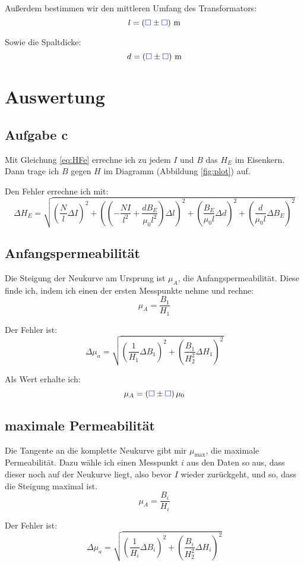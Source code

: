 \documentclass[11pt, ngerman]{article}
\newcommand{\emesswert}{\left(\messwert \pm \messwert \right)}
\newcommand{\messwert}{\textcolor{blue}{\square}}
\begin{document}
Außerdem bestimmen wir den mittleren Umfang des Transformators:
\[ l = \unit[\emesswert] m \]

Sowie die Spaltdicke:
\[ d = \unit[\emesswert] m \]

\section{Auswertung}

\subsection{Aufgabe c}

Mit Gleichung \eqref{eq:HFe} errechne ich zu jedem $I$ und $B$ das
$H_E$ im Eisenkern. Dann trage ich $B$ gegen $H$ im Diagramm (Abbildung
\ref{fig:plot}) auf.

Den Fehler errechne ich mit:
\[
	\Delta H_E
	= \sqrt{
		\left( \frac{N}{l} \Delta I \right)^2
		+ \left( \left( - \frac{NI}{l^2} + \frac{d B_E}{\mu_0 l^2} \right) \Delta l \right)^2
		+ \left( \frac{B_E}{\mu_0 l} \Delta d \right)^2
		+ \left( \frac{d}{\mu_0 l} \Delta B_E \right)^2
	}
\]

\subsection{Anfangspermeabilität}

Die Steigung der Neukurve am Ursprung ist $\mu_A$, die Anfangspermeabilität. Diese finde ich, indem ich einen der ersten Messpunkte nehme und rechne:
\[ \mu_A = \frac{B_1}{H_1} \]

Der Fehler ist:
\[
	\Delta \mu_a = \sqrt{
		\left( \frac{1}{H_1} \Delta B_1 \right)^2
		+ \left( \frac{B_1}{H_2^2} \Delta H_1 \right)^2
	}
\]

Als Wert erhalte ich:
\[ \mu_A = \emesswert \mu_0 \]

\subsection{maximale Permeabilität}

Die Tangente an die komplette Neukurve gibt mir $\mu_\text{max}$, die maximale
Permeabilität. Dazu wähle ich einen Messpunkt $i$ aus den Daten so aus, dass
dieser noch auf der Neukurve liegt, also bevor $I$ wieder zurückgeht, und so,
dass die Steigung maximal ist.
\[ \mu_A = \frac{B_i}{H_i} \]

Der Fehler ist:
\[
	\Delta \mu_a = \sqrt{
		\left( \frac{1}{H_i} \Delta B_i \right)^2
		+ \left( \frac{B_i}{H_2^2} \Delta H_i \right)^2
	}
\]
\end{document}
